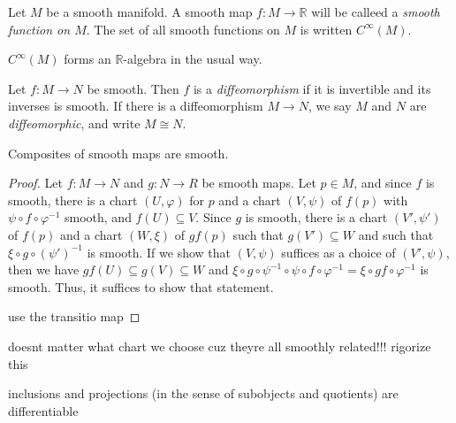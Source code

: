 \begin{definition}\label{1.2.2}
	Let $M$ be a smooth manifold. A smooth map $f : M \to \mathbb{R} $ will be calleed a \emph{smooth function on $M$}. The set of all smooth functions on $M$ is written $C^\infty (M)$.
\end{definition}

$C^\infty (M)$ forms an $\mathbb{R} $-algebra in the usual way.

\begin{definition}\label{1.2.3}
	Let $f : M \to N$ be smooth. Then $f$ is a \emph{diffeomorphism} if it is invertible and its inverses is smooth. If there is a diffeomorphism $M\to N$, we say $M$ and $N$ are \emph{diffeomorphic}, and write $M\cong N$.
\end{definition}

\begin{theorem}\label{1.2.4}
	Composites of smooth maps are smooth.
\end{theorem}
\begin{proof}
	Let $f : M \to N$ and $g : N \to R$ be smooth maps. Let $p\in M$, and since $f$ is smooth, there is a chart $(U,\varphi )$ for $p$ and a chart $(V,\psi )$ of $f(p)$ with $\psi \circ f\circ \varphi ^{-1} $ smooth, and $f(U)\subseteq V$. Since $g$ is smooth, there is a chart $(V',\psi ')$ of $f(p)$ and a chart $(W,\xi )$ of $gf(p)$ such that $g(V')\subseteq W$ and such that $\xi \circ g\circ (\psi ')^{-1} $ is smooth. If we show that $(V,\psi )$ suffices as a choice of $(V',\psi )$, then we have $gf(U)\subseteq g(V)\subseteq W$ and $\xi \circ g\circ \psi ^{-1} \circ \psi \circ f\circ \varphi ^{-1} =\xi \circ gf\circ \varphi ^{-1} $ is smooth. Thus, it suffices to show that statement.

	use the transitio map
\end{proof}

\begin{remark}
	doesnt matter what chart we choose cuz theyre all smoothly related!!! rigorize this
\end{remark}
\begin{remark}
	inclusions and projections (in the sense of subobjects and quotients) are differentiable
\end{remark}


